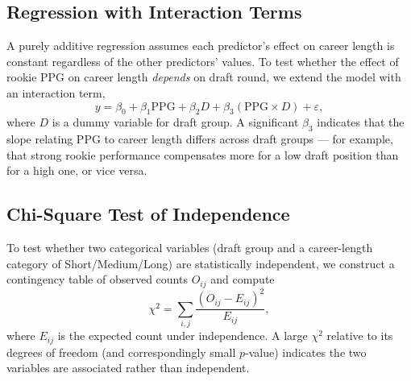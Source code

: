 \documentclass[10pt,twocolumn]{article}
\begin{document}
\subsection{Regression with Interaction Terms}
A purely additive regression assumes each predictor's effect on career
length is constant regardless of the other predictors' values. To test
whether the effect of rookie PPG on career length \textit{depends} on
draft round, we extend the model with an interaction term,
\[
  y = \beta_0 + \beta_1 \mathrm{PPG} + \beta_2 D + \beta_3 (\mathrm{PPG}
  \times D) + \varepsilon,
\]
where $D$ is a dummy variable for draft group. A significant $\beta_3$
indicates that the slope relating PPG to career length differs across
draft groups --- for example, that strong rookie performance compensates
more for a low draft position than for a high one, or vice versa.

\subsection{Chi-Square Test of Independence}
To test whether two categorical variables (draft group and a
career-length category of Short/Medium/Long) are statistically
independent, we construct a contingency table of observed counts $O_{ij}$
and compute
\[
  \chi^2 = \sum_{i,j} \frac{(O_{ij} - E_{ij})^2}{E_{ij}},
\]
where $E_{ij}$ is the expected count under independence. A large $\chi^2$
relative to its degrees of freedom (and correspondingly small $p$-value)
indicates the two variables are associated rather than independent.
\end{document}
